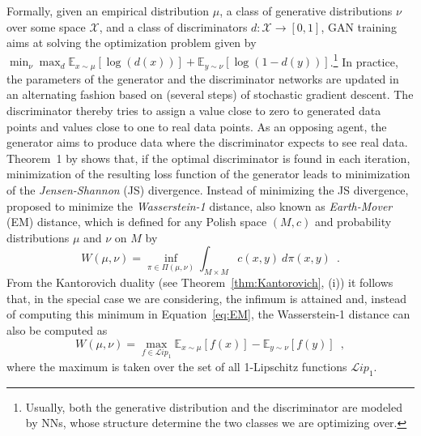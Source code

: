 \documentclass{article} %
\newcommand{\Li}[1]{\mathcal{L}ip_{#1}}
\begin{document}
Formally,  given an empirical distribution $\mu$, a class of generative distributions $\nu$ over some space $\mathcal{X}$, and a class of discriminators $d: \mathcal{X} \rightarrow [0,1]$, GAN training \citep{GAN} aims at solving the optimization problem given by $\min_{\nu} \max_{d}\mathbb{E}_{x \sim \mu} [\log(d(x))] + \mathbb{E}_{y \sim \nu} [\log (1-d(y))]$.\footnote{Usually, both the generative distribution and the discriminator are modeled by NNs, whose structure determine the two classes we are optimizing over.}
%
In practice, the parameters of the generator and the discriminator networks are updated in an alternating fashion based on (several steps) of stochastic gradient descent. The discriminator thereby tries to assign a value close to zero to generated data points and values close to one to real data points. As an opposing agent, the generator aims to produce data where the discriminator expects to see real data. Theorem~1 by \citet{GAN} shows that, if the optimal discriminator is found in each iteration, minimization of the resulting loss function of the generator leads to minimization of the \emph{Jensen-Shannon} (JS) divergence.
Instead of minimizing the JS divergence, \citet{WGAN} proposed to minimize the \emph{Wasserstein-1} distance, also known as \emph{Earth-Mover} (EM) distance, which is defined for any Polish space $(M,c)$ and probability distributions $\mu$ and $\nu$ on $M$ by
\begin{equation}\label{eq:EM}
W(\mu, \nu)=\inf_{\pi \in \Pi(\mu,\nu)} \int_{M\times M} c(x,y)\ d\pi(x,y) \enspace.
\end{equation}
%
From the Kantorovich duality (see Theorem~\ref{thm:Kantorovich}, (i))
it follows that, in the special case we are considering, the infimum is attained and, instead of computing this 
minimum 
in Equation~\eqref{eq:EM}, the {Wasserstein-1} distance can also be computed as
\begin{equation}\label{eq:EM-Dual}
W(\mu, \nu)= \max_{f \in  \Li{1}} \mathbb{E}_{x\sim \mu}[f(x)] - \mathbb{E}_{y\sim \nu}[f(y)] \enspace,
\end{equation}
where the maximum is taken over the set of all 1-Lipschitz functions $\Li{1}$. 
\end{document}
